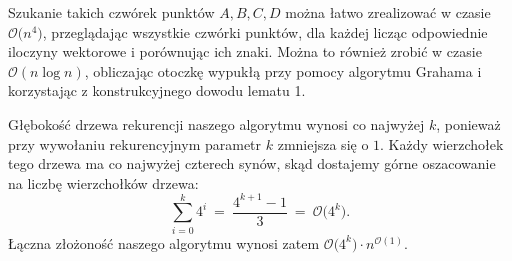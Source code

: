 \documentclass[12pt]{article}
\begin{document}
	Szukanie takich czwórek punktów \(A, B, C, D\) można łatwo zrealizować w
	czasie \(\mathcal{O} \big( n^{4} \big)\), przeglądając wszystkie czwórki
	punktów, dla każdej licząc odpowiednie iloczyny wektorowe i porównując ich
	znaki. Można to również zrobić w czasie \(\mathcal{O} (n \log n)\),
	obliczając otoczkę wypukłą przy pomocy algorytmu Grahama i korzystając z
	konstrukcyjnego dowodu lematu 1.
	
	\medskip
	
	Głębokość drzewa rekurencji naszego algorytmu wynosi co najwyżej \(k\),
	ponieważ przy wywołaniu rekurencyjnym parametr \(k\) zmniejsza się o \(1\).
	Każdy wierzchołek tego drzewa ma co najwyżej czterech synów, skąd dostajemy
	górne oszacowanie na liczbę wierzchołków drzewa:
	\[ \sum\limits_{i = 0}^{k} 4^{i} \ = \ \frac{4^{k + 1} - 1}{3} \ = \
	\mathcal{O} \big( 4^{k} \big) \text{.} \]
	Łączna złożoność naszego algorytmu wynosi zatem
	\(\mathcal{O} \big( 4^{k} \big) \cdot n^{\mathcal{O}(1)}\).
\end{document}
